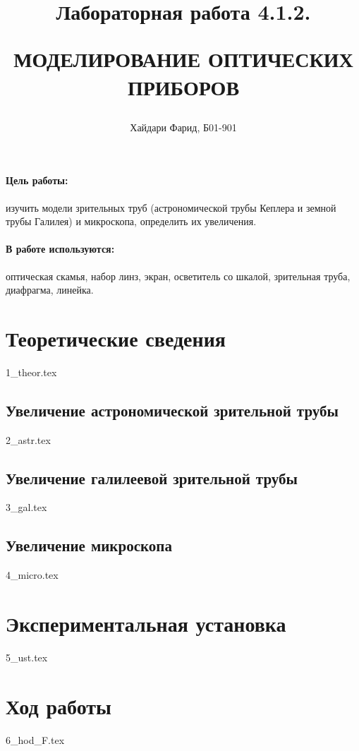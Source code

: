 \documentclass[a5paper,10pt, twoside]{article} %
\title
{
\hfill \break	\hfill \break
\hfill \break	\hfill \break
Лабораторная работа 4.1.2.

МОДЕЛИРОВАНИЕ ОПТИЧЕСКИХ ПРИБОРОВ
}
\author{Хайдари Фарид, Б01-901}
\begin{document}
\maketitle


\thispagestyle{empty} %

\newpage

\tableofcontents %
\thispagestyle{plain}
\newpage


\paragraph{Цель работы:}

изучить модели зрительных труб (астрономической трубы Кеплера и земной трубы Галилея) и микроскопа, 
определить их увеличения.

\paragraph{В работе используются:}

оптическая скамья, набор линз, экран, осветитель со шкалой, зрительная труба, диафрагма, линейка.

\section{Теоретические сведения}
{1_theor.tex}

  \subsection{Увеличение астрономической зрительной трубы}
  {2_astr.tex}

  \subsection{Увеличение галилеевой зрительной трубы}
  {3_gal.tex}

  \subsection{Увеличение микроскопа}
  {4_micro.tex}

\section{Экспериментальная установка}
{5_ust.tex}

\section{Ход работы}
{6_hod_F.tex}
\end{document}
